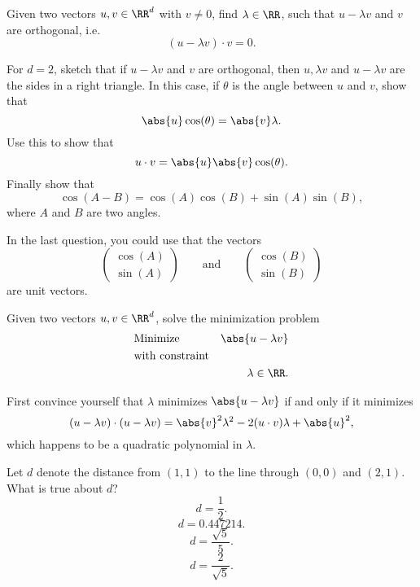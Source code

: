 \documentclass{article}
\begin{document}
\beginshex\label{dim2vec}
Given two vectors $u, v\in \RR^d$ with $v\neq 0$, find $\lambda\in \RR$, such
that $u - \lambda v$ and $v$ are orthogonal, i.e.
$$
(u - \lambda v) \cdot v = 0.
$$

For $d=2$,
sketch that if $u - \lambda v$ and $v$ are orthogonal, then
$u, \lambda v$ and $u-\lambda v$ are the sides in a right triangle.
In this case, if $\theta$ is the angle between $u$ and $v$, show that
$$
\abs{u} \cos(\theta) = \abs{v} \lambda.
$$
Use this to show that
$$
u\cdot v = \abs{u} \abs{v} \cos(\theta).
$$
Finally show that
$$
\cos(A - B) = \cos(A) \cos(B) + \sin(A) \sin(B),
$$
where $A$ and $B$ are two angles.

\begin{hint}[showhide]
In the last question, you could use that the vectors
$$
\begin{pmatrix}
  \cos(A)\\ \sin(A)
\end{pmatrix}\qquad\text{and}\qquad
\begin{pmatrix}
  \cos(B)\\ \sin(B)
\end{pmatrix}
$$
are unit vectors.
\end{hint}
\endshex


\beginshex
Given two vectors $u, v\in \RR^d$, solve the minimization problem
\begin{align*}
  &\text{Minimize} &\abs{u - \lambda v}&\\
  &\text{with constraint}\\
  &&\lambda\in\RR.
\end{align*}

\begin{hint}[showhide]
  First convince yourself that $\lambda$ minimizes $\abs{u - \lambda v}$
  if and only if it minimizes
  $$
  (u - \lambda v)\cdot (u - \lambda v) = \abs{v}^2 \lambda^2 - 2 (u\cdot v)\lambda + \abs{u}^2,
  $$
  which happens to be a quadratic polynomial in $\lambda$.
\end{hint}
\endshex

\begin{quizexercise}[showhide]
\begin{quiz}
\question
Let $d$ denote the distance from $(1, 1)$ to the line through $(0, 0)$ and $(2, 1)$. What is true about $d$?
$$
d = \frac{1}{2}.
$$
$$
d = 0.447214.
$$
$$
d = \frac{\sqrt{5}}{5}.
$$
$$
d = \frac{2}{\sqrt{5}}.
$$
\end{quiz}
\end{quizexercise}
\end{document}
